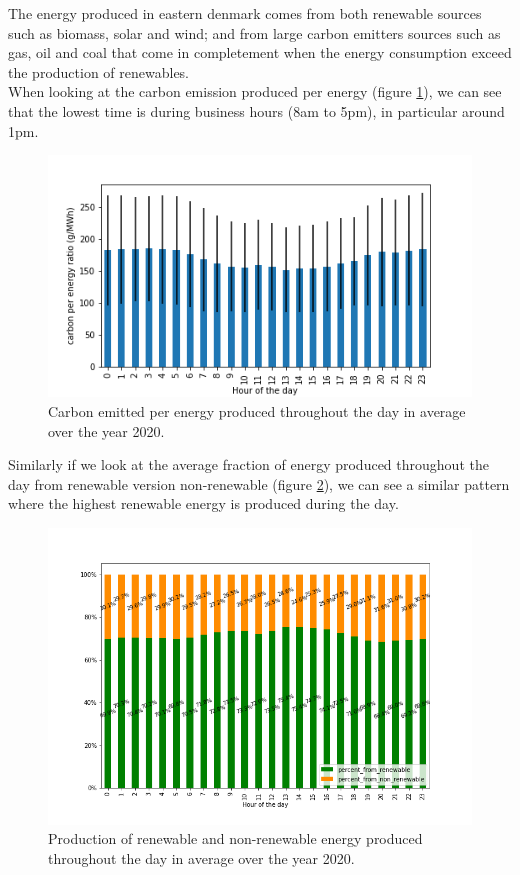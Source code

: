 \documentclass[11pt]{article} %
\begin{document}
The energy produced in eastern denmark comes from both renewable sources such as biomass, solar and wind; and from large carbon emitters sources such as gas, oil and coal that come in completement when the energy consumption exceed the production of renewables.\\
When looking at the carbon emission produced per energy (figure \ref{fig:co2_kwh}), we can see that the lowest time is during business hours (8am to 5pm), in particular around 1pm. \\

\begin{figure}
  \includegraphics[width=0.8\linewidth]{../outputs/carbon_per_energy_ratio.png}
  \caption{Carbon emitted per energy produced throughout the day in average over the year 2020.}
  \label{fig:co2_kwh}
\end{figure}
 
Similarly if we look at the average fraction of energy produced throughout the day from renewable version non-renewable (figure \ref{fig:per_green}), we can see a similar pattern where the highest renewable energy is produced during the day. 

\begin{figure}
  \includegraphics[width=1\linewidth]{../outputs/generated_energy_green_percent.png}
  \caption{Production of renewable and non-renewable energy produced throughout the day in average over the year 2020.}
  \label{fig:per_green}
\end{figure}
\end{document}

